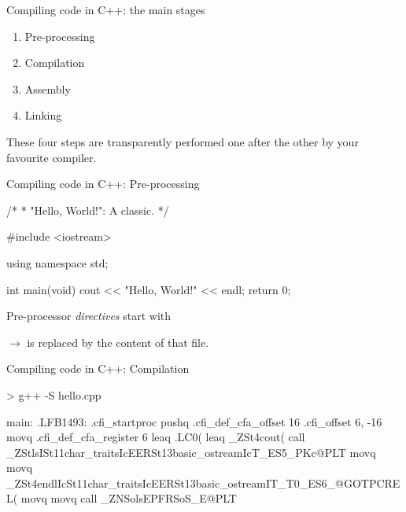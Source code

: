 \documentclass[compress]{beamer}
\begin{document}
\begin{frame}{Compiling code in C++: the main stages}

    \begin{enumerate}
        \item Pre-processing
        \item Compilation
        \item Assembly
        \item Linking
    \end{enumerate}

These four steps are transparently performed one after the other by your
    favourite compiler.

\end{frame}

\begin{frame}[fragile]{Compiling code in C++: Pre-processing}


\begin{cppcode}
/*
 * "Hello, World!": A classic.
 */

#include <iostream>

using namespace std;

int main(void)
{
    cout << "Hello, World!" << endl;
    return 0;
}
\end{cppcode}

Pre-processor \emph{directives} start with \cpp{#}

$\rightarrow$  is replaced by the content of that file.

\end{frame}

\begin{frame}[fragile]{Compiling code in C++: Compilation}

\begin{shcode}
> g++ -S hello.cpp
\end{shcode}


\begin{asmcode}
main:
.LFB1493:
	.cfi_startproc
	pushq	%
	.cfi_def_cfa_offset 16
	.cfi_offset 6, -16
	movq	%
	.cfi_def_cfa_register 6
	leaq	.LC0(%
	leaq	_ZSt4cout(%
	call	_ZStlsISt11char_traitsIcEERSt13basic_ostreamIcT_ES5_PKc@PLT
	movq	%
	movq	_ZSt4endlIcSt11char_traitsIcEERSt13basic_ostreamIT_T0_ES6_@GOTPCREL(%
	movq	%
	movq	%
	call	_ZNSolsEPFRSoS_E@PLT
\end{asmcode}
\end{frame}
\end{document}
